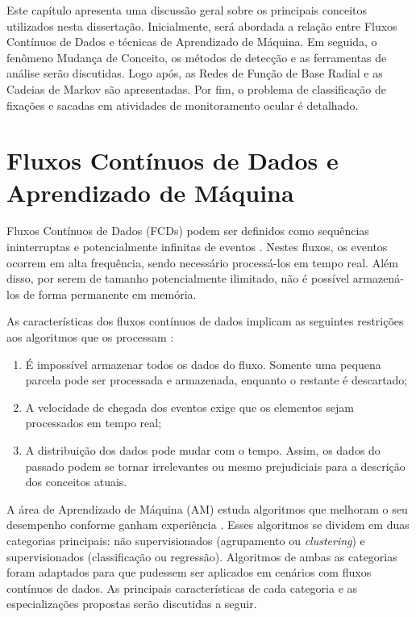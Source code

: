 \documentclass[msc, classic, a4paper]{ufbathesis}
\begin{document}
Este capítulo apresenta uma discussão geral sobre os principais conceitos utilizados nesta dissertação.
%
Inicialmente, será abordada a relação entre Fluxos Contínuos de Dados e técnicas de Aprendizado de Máquina.
%
Em seguida, o fenômeno Mudança de Conceito, os métodos de detecção e as ferramentas de análise serão discutidas.
%
Logo após, as Redes de Função de Base Radial e as Cadeias de Markov são apresentadas.
%
Por fim, o problema de classificação de fixações e sacadas em atividades de monitoramento ocular é detalhado.

\section{Fluxos Contínuos de Dados e Aprendizado de Máquina}

Fluxos Contínuos de Dados (FCDs) podem ser definidos como sequências ininterruptas e potencialmente infinitas de eventos \cite{Aggarwal:2006:DSM:1196418}.
%
Nestes fluxos, os eventos ocorrem em alta frequência, sendo necessário processá-los em tempo real.
%
Além disso, por serem de tamanho potencialmente ilimitado, não é possível armazená-los de forma permanente em memória.
%

As características dos fluxos contínuos de dados implicam as seguintes restrições aos algoritmos que os processam \cite{bifet2009data}:
%
\begin{enumerate}
    \item É impossível armazenar todos os dados do fluxo. Somente uma pequena parcela pode ser processada e armazenada, enquanto o restante é descartado;
    \item A velocidade de chegada dos eventos exige que os elementos sejam processados em tempo real;
    \item A distribuição dos dados pode mudar com o tempo. Assim, os dados do passado podem se tornar irrelevantes ou mesmo prejudiciais para a descrição dos conceitos atuais.
\end{enumerate}

A área de Aprendizado de Máquina (AM) estuda algoritmos que melhoram o seu desempenho conforme ganham experiência \cite{Mitchell:1997:ML:541177}.
%
Esses algoritmos se dividem em duas categorias principais:
%
não supervisionados (agrupamento ou \textit{clustering}) e supervisionados (classificação ou regressão).
%
Algoritmos de ambas as categorias foram adaptados para que pudessem ser aplicados em cenários com fluxos contínuos de dados.
%
As principais características de cada categoria e as especializações propostas serão discutidas a seguir.
\end{document}
